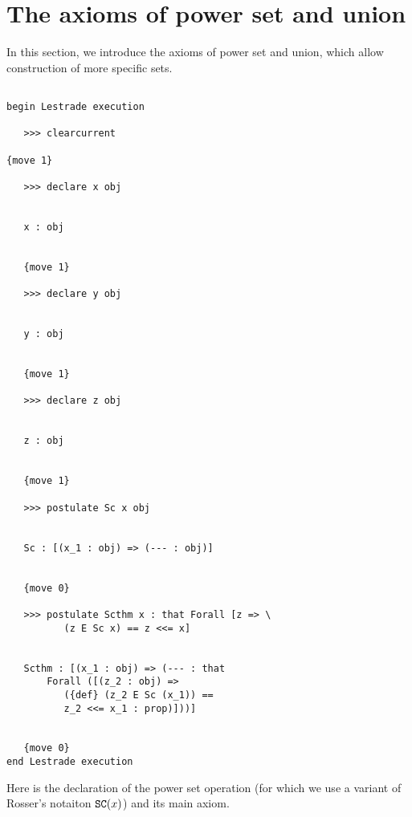 \documentclass[12pt]{article}
\begin{document}
\section{The axioms of power set and union}

In this section, we introduce the axioms of power set and union, which allow construction of more specific sets.

\begin{verbatim}

begin Lestrade execution

   >>> clearcurrent

{move 1}

   >>> declare x obj


   x : obj


   {move 1}

   >>> declare y obj


   y : obj


   {move 1}

   >>> declare z obj


   z : obj


   {move 1}

   >>> postulate Sc x obj


   Sc : [(x_1 : obj) => (--- : obj)]


   {move 0}

   >>> postulate Scthm x : that Forall [z => \
          (z E Sc x) == z <<= x]


   Scthm : [(x_1 : obj) => (--- : that 
       Forall ([(z_2 : obj) => 
          ({def} (z_2 E Sc (x_1)) == 
          z_2 <<= x_1 : prop)]))]


   {move 0}
end Lestrade execution
\end{verbatim}

Here is the declaration of the power set operation (for which we use a variant of Rosser's notaiton ${\tt SC}(x)$) and its main axiom.
\end{document}
